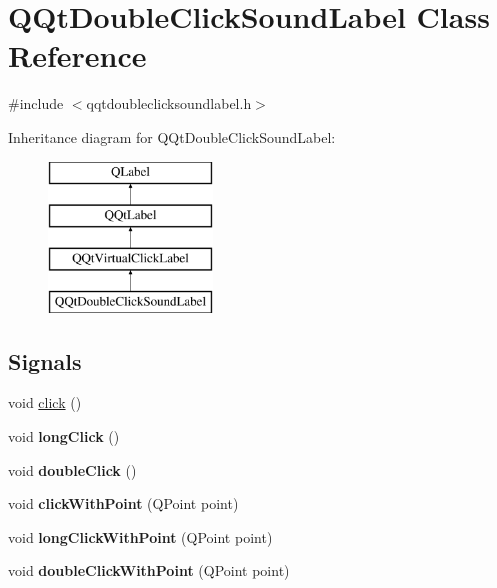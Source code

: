 \hypertarget{class_q_qt_double_click_sound_label}{}\section{Q\+Qt\+Double\+Click\+Sound\+Label Class Reference}
\label{class_q_qt_double_click_sound_label}


{\ttfamily \#include $<$qqtdoubleclicksoundlabel.\+h$>$}

Inheritance diagram for Q\+Qt\+Double\+Click\+Sound\+Label\+:\begin{figure}[H]
\begin{center}
\leavevmode
\includegraphics[height=4.000000cm]{class_q_qt_double_click_sound_label}
\end{center}
\end{figure}
\subsection*{Signals}
\begin{DoxyCompactItemize}
\item 
void \mbox{\hyperlink{class_q_qt_double_click_sound_label_a82eb8ee41f089b97195070a5a1825510}{click}} ()
\item 
\mbox{\label{class_q_qt_double_click_sound_label_a82ce235ff2838b90d0333d811f9f12e5}} 
void {\bfseries long\+Click} ()
\item 
\mbox{\label{class_q_qt_double_click_sound_label_acb97842d07285e1b0aa1ef58bc492994}} 
void {\bfseries double\+Click} ()
\item 
\mbox{\label{class_q_qt_double_click_sound_label_ad4224ae2da24d51ec465e6957c8be772}} 
void {\bfseries click\+With\+Point} (Q\+Point point)
\item 
\mbox{\label{class_q_qt_double_click_sound_label_a5857779bf2dd3336341729aad455f103}} 
void {\bfseries long\+Click\+With\+Point} (Q\+Point point)
\item 
\mbox{\label{class_q_qt_double_click_sound_label_a6924b03fc0a4ce4bfe7cc40fc158d915}} 
void {\bfseries double\+Click\+With\+Point} (Q\+Point point)
\end{DoxyCompactItemize}
